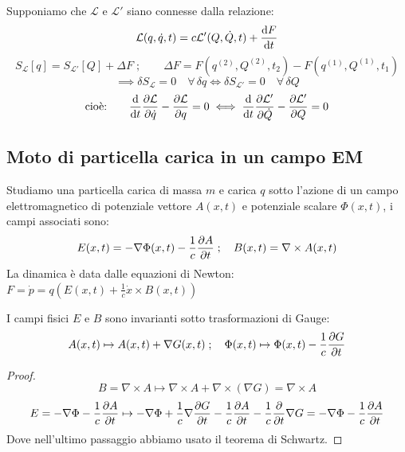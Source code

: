 Supponiamo che $\mathcal{L}$ e $\mathcal{L}'$ siano connesse dalla relazione:
\begin{equation}
    \mathcal{L}(q,\dot{q},t)= c\mathcal{L}'(Q,\dot{Q},t)+\dv{F}{t}(q,Q,t)
\end{equation}
\begin{equation*}
    S_\mathcal{L}[q] =  S_{\mathcal{L}'}[Q] + \Delta F \; ; \qquad 
    \Delta F = F(q^{(2)}, Q^{(2)}, t_2) - F(q^{(1)}, Q^{(1)}, t_1)
\end{equation*}
\begin{equation}
    \implies \delta S_\mathcal{L} = 0 \quad \forall \, \delta q 
    \iff \delta S_{\mathcal{L}'} = 0 \quad \forall \, \delta Q
\end{equation}
\begin{equation}
    \text{cioè:} \qquad \dv{t} \pdv{\mathcal{L}}{\dot{q}} - \pdv{\mathcal{L}}{q} = 0
    \iff
    \dv{t} \pdv{\mathcal{L}'}{\dot{Q}} - \pdv{\mathcal{L}'}{Q} = 0
\end{equation}



\subsection{Moto di particella carica in un campo EM}

Studiamo una particella carica di massa $m$ e carica $q$ sotto l'azione di un
 campo elettromagnetico di potenziale vettore $A(x,t)$ e potenziale scalare $\Phi(x,t)$, i campi associati sono:
\begin{equation}
    E(x,t)= -\nabla\Phi(x,t)-\frac{1}{c}\pdv{A}{t}(x,t)\;;\quad B(x,t)= \nabla\times A(x,t) 
\end{equation}
La dinamica è data dalle equazioni di Newton: $F= \dot{p}= q\left( E(x,t)+\frac{1}{c}\dot{x}\times B(x,t) \right)$
\begin{proposition}
    I campi fisici $E$ e $B $ sono invarianti sotto trasformazioni di Gauge:
    \begin{equation}
        A(x,t)\mapsto A(x,t)+\nabla G (x,t)\;; \quad \Phi(x,t)\mapsto \Phi(x,t)-\frac{1}{c}\pdv{G}{t}
    \end{equation}
\end{proposition}
\begin{proof}
    \begin{equation}
        B = \nabla\times A \mapsto  \nabla\times A +\nabla\times (\nabla  G)= \nabla\times A
    \end{equation}
    \begin{equation}
        E = -\nabla \Phi-\frac{1}{c}\pdv{A}{t}\mapsto -\nabla\Phi +\frac{1}{c}\nabla\pdv{G}{t}- \frac{1}{c}\pdv{A}{t}-\frac{1}{c}\pdv{}{t}\nabla G = -\nabla\Phi-\frac{1}{c}\pdv{A}{t}
    \end{equation}
    Dove nell'ultimo passaggio abbiamo usato il teorema di Schwartz.
\end{proof}

